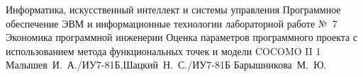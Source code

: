 \documentclass[a4paper]{bmstu}
\begin{document}
\makereporttitle
    {Информатика, искусственный интеллект и системы управления}
    {Программное обеспечение ЭВМ и информационные технологии}
    {лабораторной работе №~7}
    {Экономика программной инженерии}
    {Оценка параметров программного проекта с использованием метода
функциональных точек и модели COCOMO II}
    {1}
    {Малышев~И.~А./ИУ7-81Б,Шацкий~Н.~С./ИУ7-81Б}
    {Барышникова~М.~Ю.}








\end{document}
